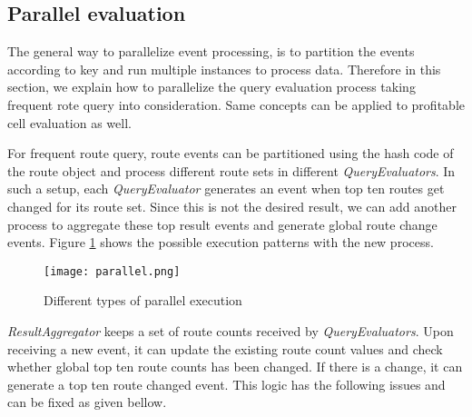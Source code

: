 \subsection{Parallel evaluation}
The general way to parallelize event processing, is to partition the events according to key and run multiple instances to process data. Therefore in this section, we explain how to parallelize the query evaluation process taking frequent rote query into consideration. Same concepts can be applied to profitable cell evaluation as well.

For frequent route query, route events can be partitioned using the hash code of the route object and process different route sets in different \textit{QueryEvaluators}. In such a setup, each \textit{QueryEvaluator} generates an event when top ten routes get changed for its route set. Since this is not the desired result, we can add another process to aggregate these top result events and generate global route change events. Figure \ref{parallel} shows the possible execution patterns with the new process.

\begin{figure}[!t]
        \centering
        \texttt{[image: parallel.png]}
        \caption{Different types of parallel execution}
        \label{parallel}
\end{figure}

\textit{ResultAggregator} keeps a set of route counts received by \textit{QueryEvaluators}. Upon receiving a new event, it can update the existing route count values and check whether global top ten route counts has been changed. If there is a change, it can generate a top ten route changed event. This logic has the following issues and can be fixed as given bellow.


